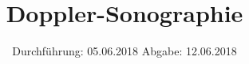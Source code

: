 

\subject{US-3}
\title{Doppler-Sonographie}
\date{%
  Durchführung: 05.06.2018
  \hspace{3em}
  Abgabe: 12.06.2018
}



\maketitle
\thispagestyle{empty}
\tableofcontents
\newpage






\printbibliography{}


